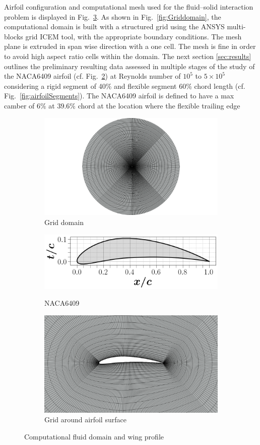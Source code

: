  
Airfoil configuration and computational mesh used for the fluid–solid interaction problem is displayed in Fig.~\ref{fig:Ggeometry}.
%
As shown in Fig.~\ref{fig:Griddomain}, the computational domain is built with a structured grid using the ANSYS multi-blocks grid ICEM tool, with the appropriate boundary conditions.
%
The mesh plane is extruded in span wise direction with a one cell.
%
The mesh is fine in order to avoid high aspect ratio cells within the domain.
%
The next section \ref{sec:results} outlines the preliminary resulting data assessed in multiple stages of the study of the NACA6409 airfoil (cf. Fig.~\ref{fig:6409}) at Reynolds number of $10^5$ to $5\times 10^5$ considering a rigid segment of 40\% and flexible segment 60\% chord length (cf. Fig.~\ref{fig:airfoilSegments}).
The NACA6409 airfoil is defined to have a max camber of $ 6\%$ at $39.6\%$ chord at the location where the flexible trailing edge

\begin{figure}[ht!]
\centering
\begin{subfigure}{.5\textwidth}
\centering
\includegraphics[width=4in]{Figures/Grid.png}
\caption{\label{fig:Griddomain} Grid domain}
\label{fig:airfoildesigna}
\end{subfigure}
\begin{subfigure}{.4\textwidth}
\centering
\includegraphics[width=.6\columnwidth]{figs/naca6409_airfoil.png}
\caption{\label{fig:owl}NACA6409}
\includegraphics[width=.6\columnwidth]{Figures/airfoilGrid.png}
\caption{\label{fig:6409}Grid around airfoil surface}
\end{subfigure}
\caption{Computational fluid domain and wing profile}
\label{fig:Ggeometry}
\end{figure}
%

